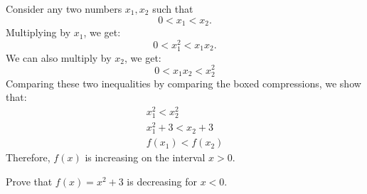 \begin{itemize}
\begin{example}
        Consider any two numbers $x_1, x_2$ such that \begin{equation}
            0<x_1<x_2.
            \label{eq:}
        \end{equation}
        Multiplying by $x_1$, we get:
        \begin{equation}
            0<x_1^2<\boxed{x_1x_2}.
            \label{eq:}
        \end{equation}
        We can also multiply by $x_2$, we get:
        \begin{equation}
            0<\boxed{x_1x_2}<x_2^2
            \label{eq:}
        \end{equation}
        Comparing these two inequalities by comparing the boxed compressions, we show that:
        \begin{align}
            x_1^2<x_2^2 \\ 
            x_1^2+3<x_2+3 \\ 
            f(x_1) < f(x_2)
            \label{eq:}
        \end{align}
        Therefore, $f(x)$ is increasing on the interval $x>0$.
    \end{example}
    \begin{example}\label{example:x^2+3 decreasing}
        Prove that $f(x)=x^2+3$ is decreasing for $x<0$.
        \vspace{2mm}


\end{example}
\end{itemize}
